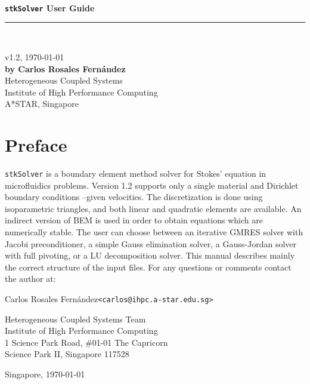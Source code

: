 \documentclass[12pt]{article}
\begin{document}
\begin{titlepage}
\verb+      +
\vspace{3cm}
\begin{flushright}
{\huge\bf\verb+stkSolver+ User Guide}
\rule{150mm}{6pt}\\
\begin{large} v1.2, \today\\
\vspace{7cm}
{\bf by Carlos Rosales Fern\'andez}\\
Heterogeneous Coupled Systems\\
Institute of High Performance Computing\\
A*STAR, Singapore
\end{large}
\end{flushright}
\end{titlepage}
\pagebreak

\section*{Preface}\noindent \verb+stkSolver+ is a boundary element method solver for Stokes' equation in microfluidics problems. Version 1.2 supports only a single material and Dirichlet boundary conditions --given velocities. The discretization is done using isoparametric triangles, and both linear and quadratic elements are available. An indirect version of BEM is used in order to obtain equations which are numerically stable. The user can choose between an iterative GMRES solver with Jacobi preconditioner, a simple Gauss elimination solver, a Gauss-Jordan solver with full pivoting, or a LU decomposition solver. This manual describes mainly the correct structure of the input files. For any questions or comments contact the author at:\par\vspace{2em}

	Carlos Rosales Fern\'andez\hspace{1cm}\verb+<carlos@ihpc.a-star.edu.sg>+\par\vspace{1em}
	
	Heterogeneous Coupled Systems Team\\
	Institute of High Performance Computing\\
	1 Science Park Road, \#01-01 The Capricorn\\
	Science Park II, Singapore 117528

	\begin{flushright}Singapore, \today\end{flushright}
\pagebreak
\end{document}

